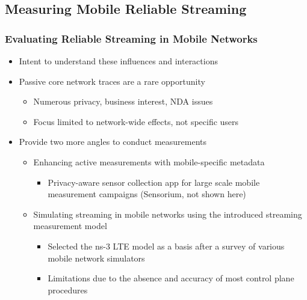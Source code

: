 \documentclass{beamer}
\begin{document}






\subsection{Measuring Mobile Reliable Streaming}

\begin{frame}
	\frametitle{Evaluating Reliable Streaming in Mobile Networks}

	\begin{itemize}
		\item Intent to understand these influences and interactions
		\item Passive core network traces are a rare opportunity
		\begin{itemize}
			\item Numerous privacy, business interest, NDA issues
			\item Focus limited to network-wide effects, not specific users
		\end{itemize}
		\pause
		\item Provide two more angles to conduct measurements
		\begin{itemize}
			\item Enhancing active measurements with mobile-specific metadata
			\begin{itemize}
				\item Privacy-aware sensor collection app for large scale mobile measurement campaigns (Sensorium, not shown here)
			\end{itemize}
			\item Simulating streaming in mobile networks using the introduced streaming measurement model
			\begin{itemize}
				\item Selected the ns-3 LTE model as a basis after a survey of various mobile network simulators
				\item Limitations due to the absence and accuracy of most control plane procedures
			\end{itemize}
		\end{itemize}
	\end{itemize}
\end{frame}
\end{document}
